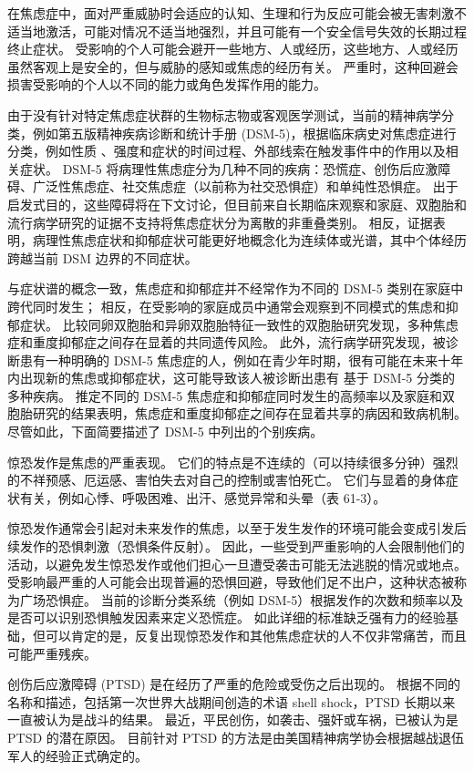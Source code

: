在焦虑症中，面对严重威胁时会适应的认知、生理和行为反应可能会被无害刺激不适当地激活，可能对情况不适当地强烈，并且可能有一个安全信号失效的长期过程 终止症状。
受影响的个人可能会避开一些地方、人或经历，这些地方、人或经历虽然客观上是安全的，但与威胁的感知或焦虑的经历有关。
严重时，这种回避会损害受影响的个人以不同的能力或角色发挥作用的能力。


由于没有针对特定焦虑症状群的生物标志物或客观医学测试，当前的精神病学分类，例如第五版精神疾病诊断和统计手册 (DSM-5)，根据临床病史对焦虑症进行分类，例如性质 、强度和症状的时间过程、外部线索在触发事件中的作用以及相关症状。
DSM-5 将病理性焦虑症分为几种不同的疾病：恐慌症、创伤后应激障碍、广泛性焦虑症、社交焦虑症（以前称为社交恐惧症）和单纯性恐惧症。
出于启发式目的，这些障碍将在下文讨论，但目前来自长期临床观察和家庭、双胞胎和流行病学研究的证据不支持将焦虑症状分为离散的非重叠类别。
相反，证据表明，病理性焦虑症状和抑郁症状可能更好地概念化为连续体或光谱，其中个体经历跨越当前 DSM 边界的不同症状。


与症状谱的概念一致，焦虑症和抑郁症并不经常作为不同的 DSM-5 类别在家庭中跨代同时发生；
相反，在受影响的家庭成员中通常会观察到不同模式的焦虑和抑郁症状。
比较同卵双胞胎和异卵双胞胎特征一致性的双胞胎研究发现，多种焦虑症和重度抑郁症之间存在显着的共同遗传风险。
此外，流行病学研究发现，被诊断患有一种明确的 DSM-5 焦虑症的人，例如在青少年时期，很有可能在未来十年内出现新的焦虑或抑郁症状，这可能导致该人被诊断出患有 基于 DSM-5 分类的多种疾病。
推定不同的 DSM-5 焦虑症和抑郁症同时发生的高频率以及家庭和双胞胎研究的结果表明，焦虑症和重度抑郁症之间存在显着共享的病因和致病机制。
尽管如此，下面简要描述了 DSM-5 中列出的个别疾病。


惊恐发作是焦虑的严重表现。
它们的特点是不连续的（可以持续很多分钟）强烈的不祥预感、厄运感、害怕失去对自己的控制或害怕死亡。
它们与显着的身体症状有关，例如心悸、呼吸困难、出汗、感觉异常和头晕（表 61-3）。


惊恐发作通常会引起对未来发作的焦虑，以至于发生发作的环境可能会变成引发后续发作的恐惧刺激（恐惧条件反射）。
因此，一些受到严重影响的人会限制他们的活动，以避免发生惊恐发作或他们担心一旦遭受袭击可能无法逃脱的情况或地点。
受影响最严重的人可能会出现普遍的恐惧回避，导致他们足不出户，这种状态被称为广场恐惧症。
当前的诊断分类系统（例如 DSM-5）根据发作的次数和频率以及是否可以识别恐惧触发因素来定义恐慌症。
如此详细的标准缺乏强有力的经验基础，但可以肯定的是，反复出现惊恐发作和其他焦虑症状的人不仅非常痛苦，而且可能严重残疾。


创伤后应激障碍 (PTSD) 是在经历了严重的危险或受伤之后出现的。
根据不同的名称和描述，包括第一次世界大战期间创造的术语 shell shock，PTSD 长期以来一直被认为是战斗的结果。
最近，平民创伤，如袭击、强奸或车祸，已被认为是 PTSD 的潜在原因。
目前针对 PTSD 的方法是由美国精神病学协会根据越战退伍军人的经验正式确定的。


